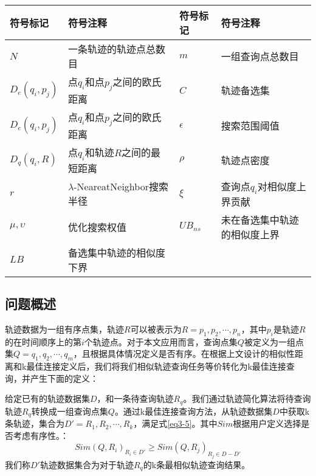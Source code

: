 \begin{table}[!htpb]
  	\centering
		\begin{tabular}{ |p{1.5cm}||p{5.5cm}|p{1.5cm}||p{5.5cm}| }
		\hline
		符号标记 & 符号注释 & 符号标记 & 符号注释\\
		\hline
		$N$ & 一条轨迹的轨迹点总数目 & $m$ & 一组查询点总数目\\
		\hline
		$D_{e}(q_{i},p_{j})$ & 点$q_{i}$和点$p_{j}$之间的欧氏距离 & $C$ & 轨迹备选集 \\
		\hline
		$D_{e}(q_{i},p_{j})$ & 点$q_{i}$和点$p_{j}$之间的欧氏距离 & $\epsilon$ & 搜索范围阈值\\
		\hline
		$D_{q}(q_{i},R)$ & 点$q_{i}$和轨迹$R$之间的最短距离 & $\rho$ & 轨迹点密度 \\
		\hline
		$r$ & $\lambda$-NeareatNeighbor搜索半径 & $\xi$ & 查询点$q_{i}$对相似度上界贡献\\
		\hline
		$\mu,\upsilon$ & 优化搜索权值 & $UB_{ns}$ & 未在备选集中轨迹的相似度上界\\
		\hline
		$LB$ & 备选集中轨迹的相似度下界 & & \\
		\hline
		\end{tabular}
\end{table}


\subsection{问题概述}
\label{sec:problem Forumation}
轨迹数据为一组有序点集，轨迹$R$可以被表示为$R={p_{1}, p_{2}, \cdots, p_{n}}$，其中$p_{i}$是轨迹$R$的在时间顺序上的第$i$个轨迹点。对于本文应用而言，查询点集$Q$被定义为一组点集$Q={q_{1}, q_{2}, \cdots, q_{m}}$，且根据具体情况定义是否有序。在根据上文设计的相似性距离和k最佳连接定义后，我们将我们相似轨迹查询任务等价转化为k最佳连接查询，并产生下面的定义：

\begin{definition}
	给定已有的轨迹数据集$D$，和一条待查询轨迹$R_{q}$。我们通过轨迹简化算法\cite{visvalingam1990douglas,chen2009trajectory}将待查询轨迹$R_{q}$转换成一组查询点集$Q$。通过k最佳连接查询方法，从轨迹数据集$D$中获取k条轨迹，集合为$D' = {R_{1}, R_{2}, \cdots, R_{k}}$，满足式\ref{eq3-5}。其中$Sim$根据用户定义选择是否考虑有序性。：
	\begin{equation}
		\label{eq3-5}
		Sim(Q,R_{i})_{R_{i} \in D'} \geq Sim(Q,R_{j})_{R_{j} \in D-D'}
	\end{equation}
	我们称$D'$轨迹数据集合为对于轨迹$R_{q}$的k条最相似轨迹查询结果。
\end{definition}

